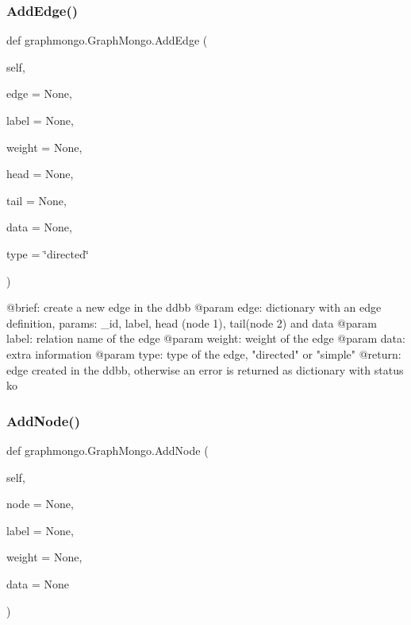 \subsubsection{\texorpdfstring{Add\+Edge()}{AddEdge()}}
{\footnotesize\ttfamily def graphmongo.\+Graph\+Mongo.\+Add\+Edge (\begin{DoxyParamCaption}\item[{}]{self,  }\item[{}]{edge = {\ttfamily None},  }\item[{}]{label = {\ttfamily None},  }\item[{}]{weight = {\ttfamily None},  }\item[{}]{head = {\ttfamily None},  }\item[{}]{tail = {\ttfamily None},  }\item[{}]{data = {\ttfamily None},  }\item[{}]{type = {\ttfamily \char`\"{}directed\char`\"{}} }\end{DoxyParamCaption})}

\begin{DoxyVerb}@brief: create a new edge in the ddbb
@param edge: dictionary with an edge definition, params: _id, label, head (node 1), tail(node 2) and data
@param label: relation name of the edge
@param weight: weight of the edge
@param data: extra information
@param type: type of the edge, "directed" or "simple"
@return: edge created in the ddbb, otherwise an error is returned as dictionary with status ko\end{DoxyVerb}
 \hypertarget{classgraphmongo_1_1GraphMongo_aa05e3a72c1e916e2d462c53e5f9a0bda}{}\label{classgraphmongo_1_1GraphMongo_aa05e3a72c1e916e2d462c53e5f9a0bda} 
\subsubsection{\texorpdfstring{Add\+Node()}{AddNode()}}
{\footnotesize\ttfamily def graphmongo.\+Graph\+Mongo.\+Add\+Node (\begin{DoxyParamCaption}\item[{}]{self,  }\item[{}]{node = {\ttfamily None},  }\item[{}]{label = {\ttfamily None},  }\item[{}]{weight = {\ttfamily None},  }\item[{}]{data = {\ttfamily None} }\end{DoxyParamCaption})}

